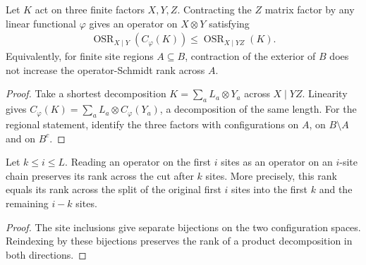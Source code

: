 \begin{lemma}
    \label{thm:lvv_right_contraction_rank}
    \leanok
    Let $K$ act on three finite factors $X,Y,Z$. Contracting the $Z$ matrix
    factor by any linear functional $\varphi$ gives an operator on $X\otimes Y$
    satisfying
    \begin{align}
        \operatorname{OSR}_{X\mid Y}(C_\varphi(K))
        \le\operatorname{OSR}_{X\mid YZ}(K).
    \end{align}
    Equivalently, for finite site regions $A\subseteq B$, contraction of the
    exterior of $B$ does not increase the operator-Schmidt rank across $A$.
\end{lemma}
\begin{proof}
    \leanok
    Take a shortest decomposition $K=\sum_a L_a\otimes Y_a$ across
    $X\mid YZ$. Linearity gives
    $C_\varphi(K)=\sum_aL_a\otimes C_\varphi(Y_a)$, a decomposition of the
    same length. For the regional statement, identify the three factors with
    configurations on $A$, on $B\setminus A$ and on $B^c$.
\end{proof}

\begin{lemma}
    \label{thm:lvv_left_operator_rank_coordinates}
    \leanok
    Let $k\le i\le L$. Reading an operator on the first $i$ sites as an
    operator on an $i$-site chain preserves its rank across the cut after $k$
    sites. More precisely, this rank equals its rank across the split of the
    original first $i$ sites into the first $k$ and the remaining $i-k$ sites.
\end{lemma}
\begin{proof}
    \leanok
    The site inclusions give separate bijections on the two configuration
    spaces. Reindexing by these bijections preserves the rank of a product
    decomposition in both directions.
\end{proof}


